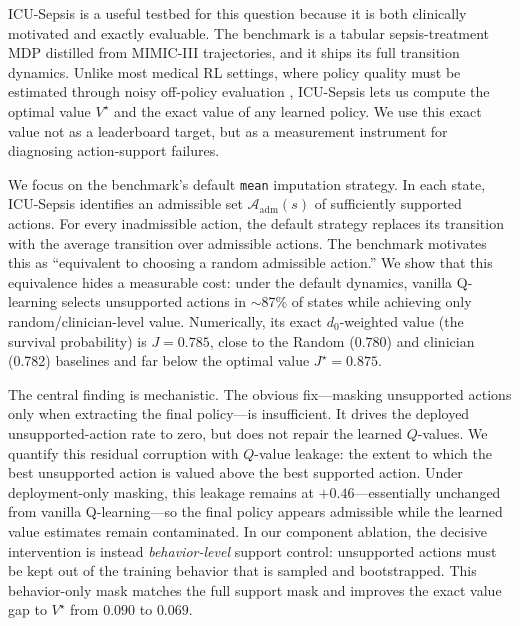 \documentclass{article}
\newcommand{\Adm}{\mathcal{A}_{\mathrm{adm}}}
\begin{document}
ICU-Sepsis \citep{choudhary2024icusepsis} is a useful testbed for this question
because it is both clinically motivated and exactly evaluable. The benchmark is a
tabular sepsis-treatment MDP distilled from MIMIC-III trajectories, and it ships
its full transition dynamics. Unlike most medical RL settings, where policy
quality must be estimated through noisy off-policy evaluation
\citep{gottesman2019guidelines,gottesman2018evaluating}, ICU-Sepsis lets us
compute the optimal value $V^\star$ and the exact value of any learned policy.
We use this exact value not as a leaderboard target, but as a measurement
instrument for diagnosing action-support failures.

We focus on the benchmark's default \texttt{mean} imputation strategy. In each
state, ICU-Sepsis identifies an admissible set $\Adm(s)$ of sufficiently supported
actions. For every inadmissible action, the default strategy replaces its
transition with the average transition over admissible actions. The benchmark
motivates this as ``equivalent to choosing a random admissible action.'' We show
that this equivalence hides a measurable cost: under the default dynamics,
vanilla Q-learning selects unsupported actions in $\sim$87\% of states while
achieving only random/clinician-level value. Numerically, its exact
$d_0$-weighted value (the survival probability) is $J{=}0.785$, close to the
Random (0.780) and clinician (0.782) baselines and far below the optimal value
$J^\star{=}0.875$.

The central finding is mechanistic. The obvious fix---masking unsupported actions
only when extracting the final policy---is insufficient. It drives the deployed
unsupported-action rate to zero, but does not repair the learned $Q$-values. We
quantify this residual corruption with $Q$-value leakage: the extent to which the
best unsupported action is valued above the best supported action. Under
deployment-only masking, this leakage remains at $+0.46$---essentially unchanged
from vanilla Q-learning---so the final policy appears admissible while the
learned value estimates remain contaminated. In our component ablation, the
decisive intervention is instead \emph{behavior-level} support control:
unsupported actions must be kept out of the training behavior that is sampled and
bootstrapped. This behavior-only mask matches the full support mask and improves
the exact value gap to $V^\star$ from $0.090$ to $0.069$.
\end{document}
